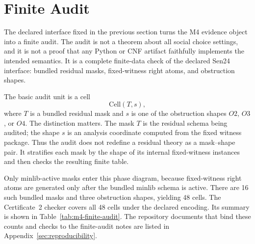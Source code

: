 \section{Finite Audit}
\label{sec:finite-audit}

The declared interface fixed in the previous section turns the M4 evidence
object into a finite audit. The audit is not a theorem about all social choice
settings, and it is not a proof that any Python or CNF artifact faithfully
implements the intended semantics. It is a complete finite-data check of the
declared Sen24 interface: bundled residual masks, fixed-witness right atoms,
and obstruction shapes.

The basic audit unit is a cell
\[
  \mathrm{Cell}(T,s),
\]
where \(T\) is a bundled residual mask and \(s\) is one of the obstruction
shapes \(O2\), \(O3\), or \(O4\). The distinction matters. The mask \(T\)
is the residual schema being audited; the shape \(s\) is an analysis coordinate
computed from the fixed witness package. Thus the audit does not redefine a
residual theory as a mask--shape pair. It stratifies each mask by the shape of
its internal fixed-witness instances and then checks the resulting finite
table.

Only minlib-active masks enter this phase diagram, because fixed-witness
right atoms are generated only after the bundled minlib schema is active.
There are 16 such bundled masks and three obstruction shapes, yielding
48 cells. The Certificate~2 checker covers all 48 cells under the declared
encoding. Its summary is shown in Table~\ref{tab:m4-finite-audit}. The
repository documents that bind these counts and checks to the finite-audit
notes are listed in Appendix~\ref{sec:reproducibility}.


